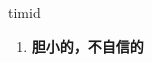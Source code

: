 
\begin{frame}
{\huge timid}
\begin{center}
\begin{enumerate}\Large
  \item \textbf{胆小的，不自信的}
\end{enumerate}
\end{center}
\end{frame}
